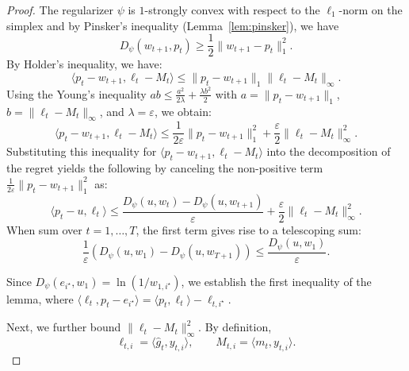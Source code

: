 \documentclass[journal,onecolumn]{IEEEtran}
\theoremstyle{plain}
\theoremstyle{definition}
\theoremstyle{remark}
\begin{document}
{\begin{proof}
    The regularizer $\psi$ is $1$-strongly convex with respect to the $\ell_{1}$-norm on the simplex and by Pinsker's inequality (Lemma~\ref{lem:pinsker}), we have  
    \begin{equation*}
    D_{\psi}(w_{t+1}, p_{t}) \ge \frac{1}{2}\|w_{t+1}- p_{t}\|_{1}^{2}.
    \end{equation*} 
    By Holder's inequality, we have:
    \begin{equation*}
    \langle p_{t} - w_{t+1}, \ell_{t} - M_{t} \rangle \le \|p_{t} - w_{t+1}\|_{1} \|\ell_{t} - M_{t}\|_{\infty}.
    \end{equation*}
    Using the Young's inequality $ab \le \frac{a^{2}}{2\lambda}+ \frac{\lambda b^{2}}{2}$ with $a=\|p_{t} - w_{t+1}\|_{1}$,
    $b=\|\ell_{t} - M_{t}\|_{\infty}$, and $\lambda = \varepsilon$, we obtain:
    \begin{equation*}
        \langle p_{t} - w_{t+1}, \ell_{t} - M_{t} \rangle \le \frac{1}{2\varepsilon}
        \|p_{t} - w_{t+1}\|_{1}^{2} + \frac{\varepsilon}{2}\|\ell_{t} - M_{t}\|_{\infty}
        ^{2}.
    \end{equation*}
    Substituting this inequality for $\langle p_{t}-w_{t+1},\ell_{t}-M_{t}\rangle$ into the decomposition of the regret yields the following by canceling the non-positive term $\frac{1}{2\varepsilon}\|p_{t} - w_{t+1}\|_{1}^{2}$ as:
    \begin{equation*}
        \langle p_{t} - u, \ell_{t} \rangle \le \frac{D_{\psi}(u, w_{t}) - D_{\psi}(u,
        w_{t+1})}{\varepsilon}+ \frac{\varepsilon}{2} \|\ell_{t} - M_{t}\|_{\infty}^{2}.
    \end{equation*}
    When sum over $t=1,\dots,T$, the first term gives rise to a telescoping sum:
    \begin{equation*}
    \frac{1}{\varepsilon}(D_{\psi}(u, w_{1}) - D_{\psi}(u, w_{T+1})) \le \frac{D_{\psi}(u,
    w_{1})}{\varepsilon}.
    \end{equation*} 
    
    Since $D_{\psi}(e_{i^\star}, w_{1}) = \ln(1/w_{1,i^\star})$, we
    establish the first inequality of the lemma, where $\langle \ell_{t}, p_{t} - e_{i^\star} \rangle=\langle p_{t}, \ell_{t} \rangle - \ell_{t,i^\star}$.

    Next, we further bound  $\|\ell_{t} - M_{t}\|_{\infty}^{2}$. By definition,
    \begin{equation*}
        \ell_{t,i}= \langle \hat{g}_{t}, y_{t,i}\rangle, \qquad
    M_{t,i}= \langle m_{t}, y_{t,i}\rangle.
    \end{equation*}


\end{proof}}
\end{document}
